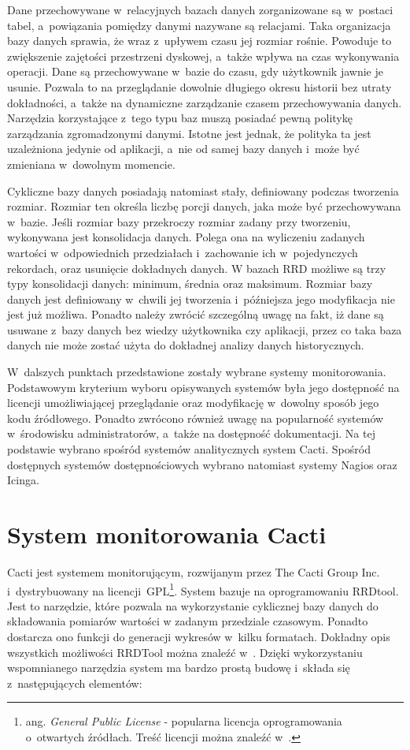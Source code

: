 Dane przechowywane w~relacyjnych bazach danych zorganizowane są
w~postaci tabel, a~powiązania pomiędzy danymi nazywane są
relacjami. Taka organizacja bazy danych sprawia, że wraz z~upływem
czasu jej rozmiar rośnie. Powoduje to zwiększenie zajętości
przestrzeni dyskowej, a~także wpływa na czas wykonywania
operacji. Dane są przechowywane w~bazie do czasu, gdy użytkownik
jawnie je usunie. Pozwala to na przeglądanie dowolnie długiego okresu
historii bez utraty dokładności, a~także na dynamiczne zarządzanie
czasem przechowywania danych. Narzędzia korzystające z~tego typu baz
muszą posiadać pewną politykę zarządzania zgromadzonymi
danymi. Istotne jest jednak, że polityka ta jest uzależniona jedynie
od aplikacji, a~nie od samej bazy danych i~może być zmieniana
w~dowolnym momencie.

Cykliczne bazy danych posiadają natomiast stały, definiowany podczas
tworzenia rozmiar. Rozmiar ten określa liczbę porcji danych, jaka może
być przechowywana w~bazie. Jeśli rozmiar bazy przekroczy rozmiar
zadany przy tworzeniu, wykonywana jest konsolidacja danych. Polega ona
na wyliczeniu zadanych wartości w~odpowiednich przedziałach
i~zachowanie ich w~pojedynczych rekordach, oraz usunięcie dokładnych
danych. W bazach RRD możliwe są trzy typy konsolidacji danych:
minimum, średnia oraz maksimum. Rozmiar bazy danych jest definiowany
w~chwili jej tworzenia i~późniejsza jego modyfikacja nie jest już
możliwa. Ponadto należy zwrócić szczególną uwagę na fakt, iż dane są
usuwane z~bazy danych bez wiedzy użytkownika czy aplikacji, przez co
taka baza danych nie może zostać użyta do dokładnej analizy danych
historycznych.

W~dalszych punktach przedstawione zostały wybrane systemy
monitorowania. Podstawowym kryterium wyboru opisywanych systemów była
jego dostępność na licencji umożliwiającej przeglądanie oraz
modyfikację w~dowolny sposób jego kodu źródłowego. Ponadto zwrócono
również uwagę na popularność systemów w~środowisku administratorów,
a~także na dostępność dokumentacji. Na tej podstawie wybrano spośród
systemów analitycznych system Cacti. Spośród dostępnych systemów
dostępnościowych wybrano natomiast systemy Nagios oraz Icinga.


\section[Cacti][System monitorowania Cacti]{System monitorowania Cacti}

Cacti jest systemem monitorującym, rozwijanym przez The Cacti Group
Inc. i~dystrybuowany na licencji~GPL\footnote{ ang. {\em General
    Public License} - popularna licencja oprogramowania o~otwartych
  źródłach. Treść licencji można znaleźć w~\cite{www:GPLv2}.}. System
bazuje na oprogramowaniu RRDtool\cite{www:RRDtool}. Jest to narzędzie,
które pozwala na wykorzystanie cyklicznej bazy danych do składowania
pomiarów wartości w zadanym przedziale czasowym. Ponadto dostarcza ono
funkcji do generacji wykresów w~kilku formatach. Dokładny opis
wszystkich możliwości RRDTool można znaleźć
w~\cite{www:RRDtool}. Dzięki wykorzystaniu wspomnianego narzędzia
system ma bardzo prostą budowę i~składa się z~następujących elementów:

